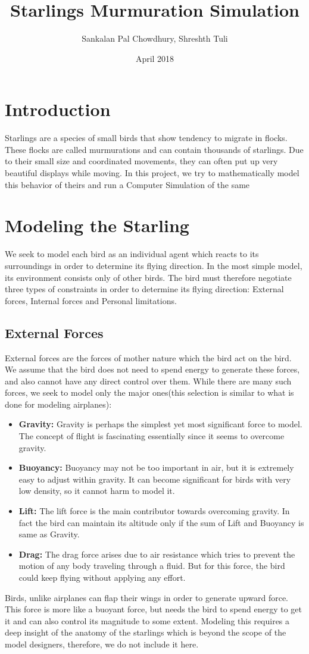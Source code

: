 \documentclass{article}
\title{Starlings Murmuration Simulation}
\author{Sankalan Pal Chowdhury, Shreshth Tuli}
\date{April 2018}
\begin{document}
\maketitle

\section{Introduction}
Starlings are a species of small birds that show tendency to migrate in flocks. These flocks are called murmurations and can contain thousands of starlings. Due to their small size and coordinated movements, they can often put up very beautiful displays while moving. In this project, we try to mathematically model this behavior of theirs and run a Computer Simulation of the same
\section{Modeling the Starling}
We seek to model each bird as an individual agent which reacts to its surroundings in order to determine its flying direction. In the most simple model, its environment consists only of other birds. The bird must therefore negotiate three types of constraints in order to determine its flying direction: External forces, Internal forces and Personal limitations.
\subsection{External Forces}
External forces are the forces of mother nature which the bird act on the bird. We assume that the bird does not need to spend energy to generate these forces, and also cannot have any direct control over them. While there are many such forces, we seek to model only the major ones(this selection is similar to what is done for modeling airplanes):
\begin{itemize}
    \item \textbf{Gravity:} Gravity is perhaps the simplest yet most significant force to model. The concept of flight is fascinating essentially since it seems to overcome gravity.
    \item \textbf{Buoyancy:} Buoyancy may not be too important in air, but it is extremely easy to adjust within gravity. It can become significant for birds with very low density, so it cannot harm to model it.
    \item \textbf{Lift:} The  lift force is the main contributor towards overcoming gravity. In fact the bird can maintain its altitude only if the sum of Lift and Buoyancy is same as Gravity.
    \item \textbf{Drag:} The drag force arises due to air resistance which tries to prevent the motion of any body traveling through a fluid. But for this force, the bird could keep flying without applying any effort.
\end{itemize}
Birds, unlike airplanes can flap their wings in order to generate upward force. This force is more like a buoyant force, but needs the bird to spend energy to get it and can also control its magnitude to some extent. Modeling this requires a deep insight of the anatomy of the starlings which is beyond the scope of the model designers, therefore, we do not include it here.
\end{document}
